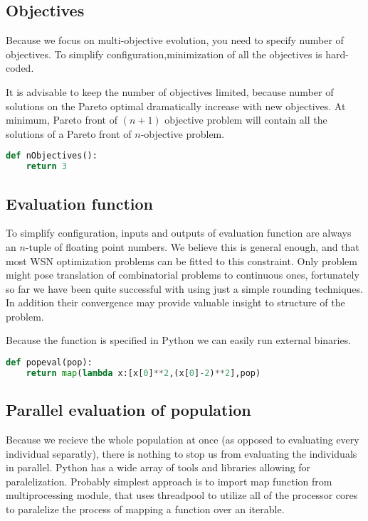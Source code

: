 \documentclass[12pt,oneside]{fithesis2}
\begin{document}
\subsection{Objectives}
Because we focus on multi-objective evolution, you need to specify number of objectives. To simplify configuration,minimization of all the objectives is hard-coded.

It is advisable to keep the number of objectives limited, because number of solutions on the Pareto optimal dramatically increase with new objectives. At minimum, Pareto front of $(n+1)$ objective problem will contain all the solutions of a Pareto front of $n$-objective problem. \cite{talbi2009metaheuristics}
\begin{lstlisting}[language=Python,label=obj_example,caption=Objectives]
def nObjectives():
	return 3
\end{lstlisting}
\subsection{Evaluation function}

To simplify configuration, inputs and outputs of evaluation function are always an $n$-tuple of floating point numbers. We believe this is general enough, and that most WSN optimization problems can be fitted to this constraint. Only problem might pose translation of combinatorial problems to continuous ones, fortunately so far we have been quite successful with using just a simple rounding techniques. In addition their convergence may provide valuable insight to structure of the problem.

Because the function is specified in Python we can easily run external binaries.
\begin{lstlisting}[language=Python,label=obj_example,caption=Evaluation]
def popeval(pop):
	return map(lambda x:[x[0]**2,(x[0]-2)**2],pop)
\end{lstlisting}

\subsection{Parallel evaluation of population}
Because we recieve the whole population at once (as opposed to evaluating every individual separatly), there is nothing to stop us from evaluating the individuals in parallel.
Python has a wide array of tools and libraries allowing for paralelization. Probably simplest approach is to import map function from multiprocessing module, that uses threadpool to utilize all of the processor cores to paralelize the process of mapping a function over an iterable.
\end{document}
